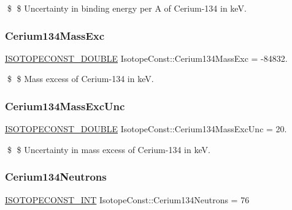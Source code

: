 \$ \$ Uncertainty in binding energy per A of Cerium-\/134 in keV. \mbox{\label{group___isotope_const-_cerium-_ce134_ga399ff446585966dfe7ba92bfb6e99551}} 
\subsubsection{\texorpdfstring{Cerium134\+Mass\+Exc}{Cerium134MassExc}}
{\footnotesize\ttfamily \mbox{\hyperlink{group___isotope_const-_macros_ga8f45a7272ce02c0b4c65c44636ed719a}{I\+S\+O\+T\+O\+P\+E\+C\+O\+N\+S\+T\+\_\+\+D\+O\+U\+B\+LE}} Isotope\+Const\+::\+Cerium134\+Mass\+Exc = -\/84832.}

\$ \$ Mass excess of Cerium-\/134 in keV. \mbox{\label{group___isotope_const-_cerium-_ce134_ga1b5f5001927c6ce42590fe1c17743ef7}} 
\subsubsection{\texorpdfstring{Cerium134\+Mass\+Exc\+Unc}{Cerium134MassExcUnc}}
{\footnotesize\ttfamily \mbox{\hyperlink{group___isotope_const-_macros_ga8f45a7272ce02c0b4c65c44636ed719a}{I\+S\+O\+T\+O\+P\+E\+C\+O\+N\+S\+T\+\_\+\+D\+O\+U\+B\+LE}} Isotope\+Const\+::\+Cerium134\+Mass\+Exc\+Unc = 20.}

\$ \$ Uncertainty in mass excess of Cerium-\/134 in keV. \mbox{\label{group___isotope_const-_cerium-_ce134_ga46bb65f72d7e49680418193d516f55af}} 
\subsubsection{\texorpdfstring{Cerium134\+Neutrons}{Cerium134Neutrons}}
{\footnotesize\ttfamily \mbox{\hyperlink{group___isotope_const-_macros_ga5f18360b3e99483a35c32d789e62621c}{I\+S\+O\+T\+O\+P\+E\+C\+O\+N\+S\+T\+\_\+\+I\+NT}} Isotope\+Const\+::\+Cerium134\+Neutrons = 76}


